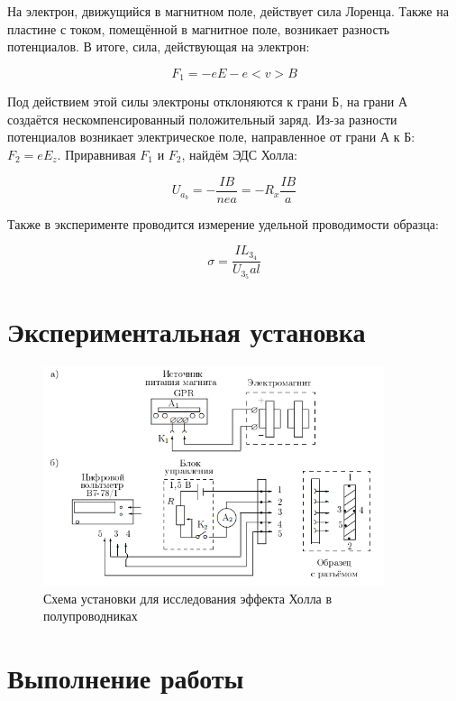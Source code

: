 \documentclass[a4paper]{article}
\begin{document}
На электрон, движущийся в магнитном поле, действует сила Лоренца. Также на пластине с током, помещённой в магнитное поле, возникает разность потенциалов. В итоге, сила, действующая на электрон:

\begin{equation}
    F_1 = -eE - e<v>B
\end{equation}


Под действием этой силы электроны отклоняются к грани Б, на грани А создаётся нескомпенсированный положительный заряд. Из-за разности потенциалов возникает электрическое поле, направленное от грани А к Б: $F_2 = eE_z$. Приравнивая $F_1$ и $F_2$, найдём ЭДС Холла:

\begin{equation}
    U_a_b = - \frac{IB}{nea} = -R_x \frac{IB}{a}
\end{equation}

Также в эксперименте проводится измерение удельной проводимости образца:

\begin{equation}
    \sigma = \frac{I L_3_4}{U_3_5 a l}
\end{equation}

\section{Экспериментальная установка}

\begin{figure}[h]
    \centering
    \includegraphics[width=10cm]{fig2.PNG}
    \caption{Схема установки для исследования эффекта Холла в полупроводниках}
    \label{fig:vac}
\end{figure}

\section{Выполнение работы}
\end{document}
